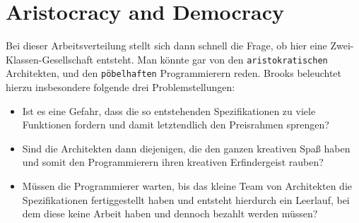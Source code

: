 \documentclass[a4paper, ngerman, 12pt, usenames, dvipsnames]{article}
\begin{document}
 \section{Aristocracy and Democracy}
Bei dieser Arbeitsverteilung stellt sich dann schnell die Frage, ob hier eine Zwei-Klassen-Gesellschaft entsteht. Man könnte gar von den \texttt{aristokratischen} Architekten, und den \texttt{pöbelhaften} Programmierern reden. Brooks beleuchtet hierzu insbesondere folgende drei Problemstellungen:
\begin{itemize}
    \item Ist es eine Gefahr, dass die so entstehenden Spezifikationen zu viele Funktionen fordern und damit letztendlich den Preisrahmen sprengen?
    \item Sind die Architekten dann diejenigen, die den ganzen kreativen Spaß haben und somit den Programmierern ihren kreativen Erfindergeist rauben?
    \item Müssen die Programmierer warten, bis das kleine Team von Architekten die Spezifikationen fertiggestellt haben und entsteht hierdurch ein Leerlauf, bei dem diese keine Arbeit haben und dennoch bezahlt werden müssen?
\end{itemize} 
\end{document}
